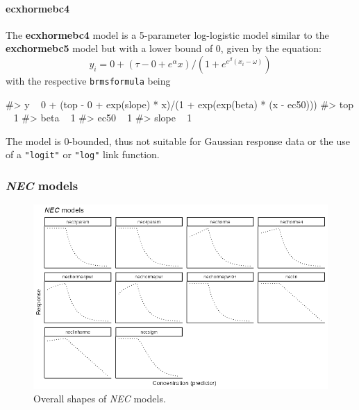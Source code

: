 \hypertarget{ecxhormebc4}{%
\paragraph{ecxhormebc4}\label{ecxhormebc4}}

The \textbf{ecxhormebc4} model is a 5-parameter log-logistic model
similar to the \textbf{exchormebc5} model but with a lower bound of 0,
given by the equation:
\[y_i = 0 + (\tau - 0 + e^{\alpha} x)/ (1 + e^{e^{\beta} (x_i - \omega)})\]
with the respective \texttt{brmsformula} being

\begin{Schunk}
\begin{Soutput}
#> y ~ 0 + (top - 0 + exp(slope) * x)/(1 + exp(exp(beta) * (x - ec50))) 
#> top ~ 1
#> beta ~ 1
#> ec50 ~ 1
#> slope ~ 1
\end{Soutput}
\end{Schunk}

The model is 0-bounded, thus not suitable for Gaussian response data or
the use of a \texttt{"logit"} or \texttt{"log"} link function.

\newpage

\hypertarget{nec-models}{%
\subsubsection{\texorpdfstring{\emph{NEC}
models}{NEC models}}\label{nec-models}}

\begin{figure}[ht]
  \centering
  \includegraphics[width=1\textwidth]{../vignettes/vignette-fig-exmp2b-theoretical_nec_curves.png}
  \captionsetup{justification=justified,format=plain}
  \caption{Overall shapes of  \textit{NEC} models.}
  \label{fig2}
\end{figure}

